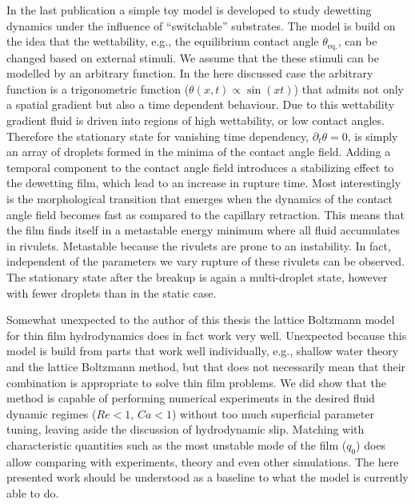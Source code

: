 In the last publication a simple toy model is developed to study dewetting dynamics under the influence of ``switchable'' substrates.
The model is build on the idea that the wettability, e.g., the equilibrium contact angle $\theta_{\text{eq.}}$, can be changed based on external stimuli. 
We assume that the these stimuli can be modelled by an arbitrary function.
In the here discussed case the arbitrary function is a trigonometric function ($\theta(x,t) \propto \sin(x t)$) that admits not only a spatial gradient but also a time dependent behaviour.
Due to this wettability gradient fluid is driven into regions of high wettability, or low contact angles.
Therefore the stationary state for vanishing time dependency, $\partial_t\theta = 0$, is simply an array of droplets formed in the minima of the contact angle field.
Adding a temporal component to the contact angle field introduces a stabilizing effect to the dewetting film, which lead to an increase in rupture time.
Most interestingly is the morphological transition that emerges when the dynamics of the contact angle field becomes fast as compared to the capillary retraction.
This means that the film finds itself in a metastable energy minimum where all fluid accumulates in rivulets.
Metastable because the rivulets are prone to an instability. 
In fact, independent of the parameters we vary rupture of these rivulets can be observed. 
The stationary state after the breakup is again a multi-droplet state, however with fewer droplets than in the static case.

Somewhat unexpected to the author of this thesis the lattice Boltzmann model for thin film hydrodynamics does in fact work very well. 
Unexpected because this model is build from parts that work well individually, e.g., shallow water theory and the lattice Boltzmann method, but that does not necessarily mean that their combination is appropriate to solve thin film problems.  
We did show that the method is capable of performing numerical experiments in the desired fluid dynamic regimes ($Re < 1$, $Ca < 1$) without too much superficial parameter tuning, leaving aside the discussion of hydrodynamic slip. 
Matching with characteristic quantities such as the most unstable mode of the film ($q_0$) does allow comparing with experiments, theory and even other simulations.
The here presented work should be understood as a baseline to what the model is currently able to do.

